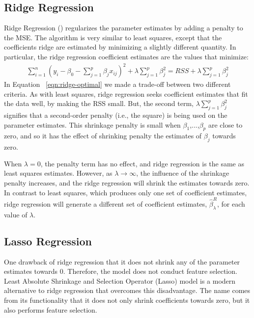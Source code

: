 \subsection{Ridge Regression}

Ridge Regression (\textcite{hoerl1970ridge})  regularizes the parameter
estimates by adding a penalty to the MSE. The algorithm is very similar to least
squares, except that the coefficients ridge are estimated by minimizing a
slightly different quantity. In particular, the ridge regression coefficient
estimates  are the values that minimize:
\begin{eqnarray}
    \label{eqn:ridge-optimal}
    \sum_{i=1}^{n}(y_i -\beta_0 - \sum_{j=1}^{p}\beta_j x_{ij}) ^ 2 + \lambda
    \sum_{j=1}^{p}\beta_{j}^2 = RSS + \lambda \sum_{j=1}^{p}\beta_{j}^2
\end{eqnarray}
In  Equation  ~\ref{eqn:ridge-optimal} we made a trade-off between two different
criteria. As with least squares, ridge regression seeks coefficient estimates
that fit the data well, by making the RSS small. But, the second term, $\lambda
\sum_{j=1}^{p}\beta_{j}^2$ signifies that a second-order penalty (i.e., the
square) is being used on the parameter estimates.
This shrinkage penalty is small when $\beta_1$,...,$\beta_p$ are close to zero,
and so it has the effect of shrinking penalty the estimates of $\beta_j$ towards
zero.

When $\lambda = 0$, the penalty term has no effect, and ridge regression is the same
as least squares estimates. However, as $\lambda \to \infty$, the influence of
the shrinkage penalty increases, and the ridge regression will shrink the
estimates towards  zero.
In contrast to least squares, which produces only one set of coefficient
estimates, ridge regression will generate a different set of coefficient
estimates, $\hat{\beta}_{\lambda} ^ {R}$, for each value of $\lambda$.

\subsection{Lasso Regression}
One drawback of ridge regression that it does not shrink any of the parameter
estimates towards 0. Therefore, the model does not conduct feature selection.
Least Absolute Shrinkage and Selection Operator (Lasso)
\parencite{tibshirani1996regression} model is a modern
alternative to ridge regression that overcomes this disadvantage. The name comes
from its functionality that it does not only shrink coefficients towards zero,
but it also performs feature selection.


